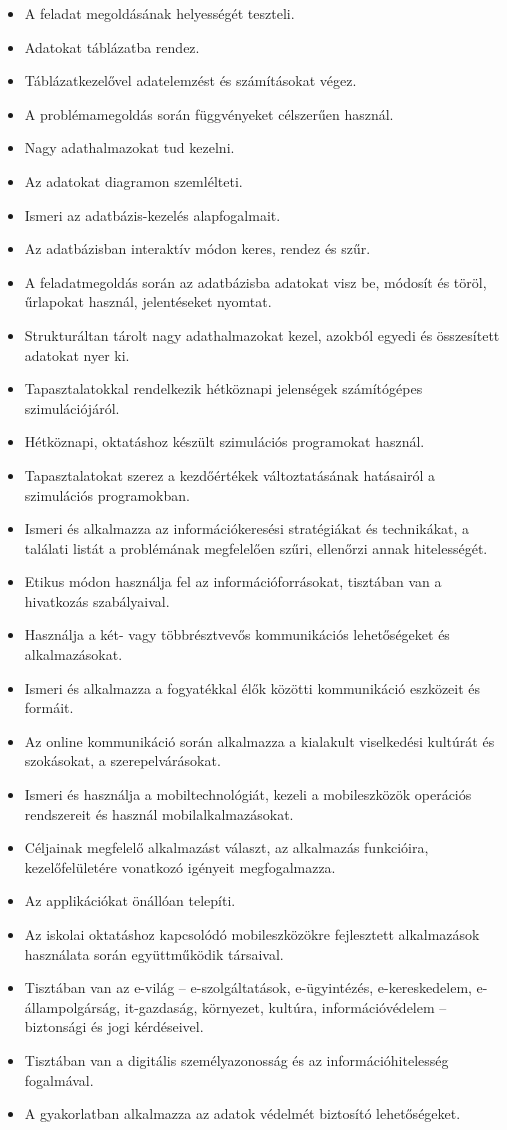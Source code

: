 \begin{itemize}
\item
  A feladat megoldásának helyességét teszteli.
\item
  Adatokat táblázatba rendez.
\item
  Táblázatkezelővel adatelemzést és számításokat végez.
\item
  A problémamegoldás során függvényeket célszerűen használ.
\item
  Nagy adathalmazokat tud kezelni.
\item
  Az adatokat diagramon szemlélteti.
\item
  Ismeri az adatbázis-kezelés alapfogalmait.
\item
  Az adatbázisban interaktív módon keres, rendez és szűr.
\item
  A feladatmegoldás során az adatbázisba adatokat visz be, módosít és
  töröl, űrlapokat használ, jelentéseket nyomtat.
\item
  Strukturáltan tárolt nagy adathalmazokat kezel, azokból egyedi és
  összesített adatokat nyer ki.
\item
  Tapasztalatokkal rendelkezik hétköznapi jelenségek számítógépes
  szimulációjáról.
\item
  Hétköznapi, oktatáshoz készült szimulációs programokat használ.
\item
  Tapasztalatokat szerez a kezdőértékek változtatásának hatásairól a
  szimulációs programokban.
\item
  Ismeri és alkalmazza az információkeresési stratégiákat és
  technikákat, a találati listát a problémának megfelelően szűri,
  ellenőrzi annak hitelességét.
\item
  Etikus módon használja fel az információforrásokat, tisztában van a
  hivatkozás szabályaival.
\item
  Használja a két- vagy többrésztvevős kommunikációs lehetőségeket és
  alkalmazásokat.
\item
  Ismeri és alkalmazza a fogyatékkal élők közötti kommunikáció eszközeit
  és formáit.
\item
  Az online kommunikáció során alkalmazza a kialakult viselkedési
  kultúrát és szokásokat, a szerepelvárásokat.
\item
  Ismeri és használja a mobiltechnológiát, kezeli a mobileszközök
  operációs rendszereit és használ mobilalkalmazásokat.
\item
  Céljainak megfelelő alkalmazást választ, az alkalmazás funkcióira,
  kezelőfelületére vonatkozó igényeit megfogalmazza.
\item
  Az applikációkat önállóan telepíti.
\item
  Az iskolai oktatáshoz kapcsolódó mobileszközökre fejlesztett
  alkalmazások használata során együttműködik társaival.
\item
  Tisztában van az e-világ -- e-szolgáltatások, e-ügyintézés,
  e-kereskedelem, e-állampolgárság, it-gazdaság, környezet, kultúra,
  információvédelem -- biztonsági és jogi kérdéseivel.
\item
  Tisztában van a digitális személyazonosság és az információhitelesség
  fogalmával.
\item
  A gyakorlatban alkalmazza az adatok védelmét biztosító lehetőségeket.
\end{itemize}

